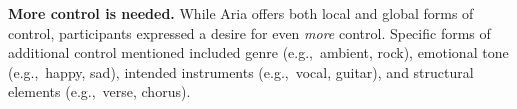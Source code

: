 \documentclass{article}
\begin{document}

\textbf{More control is needed.}
While Aria offers both local and global forms of control, 
participants expressed a desire for even \emph{more} control. 
Specific forms of additional control mentioned included 
genre (e.g.,~ambient, rock), 
emotional tone (e.g.,~happy, sad), 
intended instruments (e.g.,~vocal, guitar), 
and structural elements (e.g.,~verse, chorus).
\end{document}
